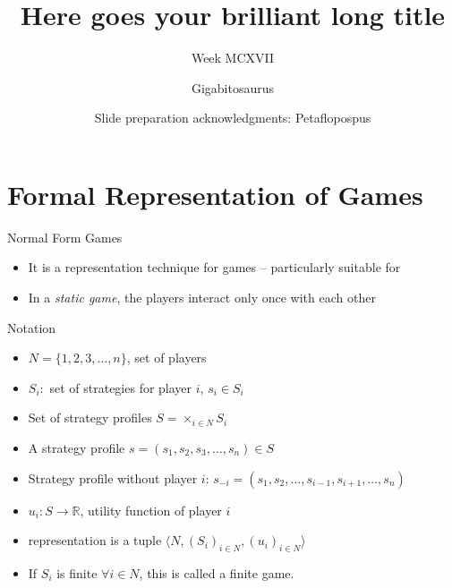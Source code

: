 \documentclass[10pt,aspectratio=169]{beamer}
\title[Short title]{Here goes your brilliant long title}
\subtitle{Week MCXVII}
\author{Gigabitosaurus}
\date{\footnotesize Slide preparation acknowledgments: Petaflopospus}
\newcommand{\greenblock}[2]{\begin{exampleblock}{#1}{#2}\end{exampleblock} }
\newcommand{\impterm}[1]{\textbf{\color{purple}{#1}}}
\newcommand{\impcompterm}[1]{\textbf{\color{blue}{#1}}}
\begin{document}
\maketitle

\section{Formal Representation of Games}

\begin{frame}{Normal Form Games}
\begin{itemize}
    \item It is a representation technique for games -- particularly suitable for \impterm{static games}
    \item In a {\em static game}, the players interact only once with each other
\end{itemize}

\pause
\greenblock{Notation}{
\begin{itemize}
    \item $N=\{1, 2, 3, \ldots, n\}$, set of players
    \item $S_i:$ set of strategies for player $i$, \quad $s_i \in S_i$
    \item Set of strategy profiles $S=\times_{i \in N} S_i$
    \item A strategy profile $s = (s_1, s_2, s_3, \ldots, s_n) \in S$
    \item Strategy profile without player $i$: $s_{-i} = (s_1, s_2, ..., s_{i-1}, s_{i+1}, \ldots, s_n)$
    \item $u_i: S \to \mathbb{R}$, utility function of player $i$
\end{itemize}
}
\begin{itemize}
    \item \impcompterm{Normal form} representation is a tuple $ \langle N, (S_i)_{i \in N}, (u_i)_{i \in N} \rangle$
    \item If $S_i$ is finite $\forall i \in N$, this is called a finite game.
\end{itemize}
\end{frame}
\end{document}
